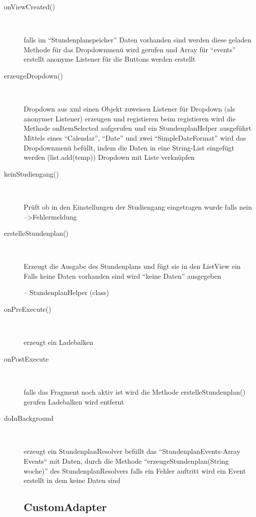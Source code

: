 \begin{description}
\item[onViewCreated()]~\par
falls im “Stundenplanspeicher” Daten vorhanden sind werden diese geladen
Methode für das Dropdownmenü wird gerufen und Array für “events” erstellt
anonyme Listener für die Buttons werden erstellt

\item[erzeugeDropdown()]~\par
Dropdown aus xml einen Objekt zuweisen
Listener für Dropdown (als anonymer Listener) erzeugen und registieren
beim registieren wird die Methode onItemSelected aufgerufen und ein StundenplanHelper ausgeführt
Mittels eines “Calendar”, “Date” und zwei “SimpleDateFormat” wird das Dropdownmenü befüllt, indem die Daten in eine String-List eingefügt werden (list.add(temp))
Dropdown mit Liste verknüpfen
 
\item[keinStudiengang()]~\par
Prüft ob in den Einstellungen der Studiengang eingetragen wurde
falls nein -->Fehlermeldung

\item[erstelleStundenplan()]~\par
Erzeugt die Ausgabe des Stundenplans und fügt sie in den ListView ein
Falls keine Daten vorhanden sind wird “keine Daten” ausgegeben
 
-- StundenplanHelper (class)
 
\item[onPreExecute()]~\par
erzeugt ein Ladebalken
\item[onPostExecute]~\par
falls das Fragment noch aktiv ist wird die Methode erstelleStundenplan() gerufen
Ladebalken wird entfernt
 
\item[doInBackground]~\par
erzeugt ein StundenplanResolver
befüllt das “StundenplanEvents-Array Events“ mit Daten, durch die Methode “erzeugeStundenplan(String woche)” des StundenplanResolvers
falls ein Fehler auftritt wird ein Event erstellt in dem keine Daten sind


\newpage
\subsection{CustomAdapter} 

\end{description}

